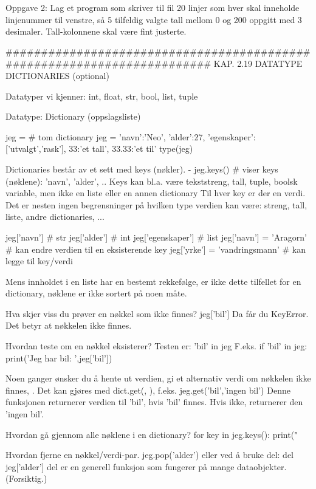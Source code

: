 {Oppgave 2: Lag et program som skriver til fil 20 linjer som hver skal inneholde linjenummer til venstre,
så 5 tilfeldig valgte tall mellom 0 og 200 oppgitt med 3 desimaler.
Tall-kolonnene skal være fint justerte. 

######################################################################## 
KAP. 2.19  DATATYPE DICTIONARIES  (optional)

Datatyper vi kjenner: int, float, str, bool, list, tuple 

Datatype: Dictionary (oppslagsliste)

jeg = {}  # tom dictionary
jeg = {'navn':'Neo', 'alder':27, 'egenskaper':['utvalgt','rask'], 33:'et tall', 33.33:'et til'} 
type(jeg) 

Dictionaries består av et sett med keys (nøkler). 
- jeg.keys()  # viser keys (nøklene): 'navn', 'alder', ..
Keys kan bl.a. være tekststreng, tall, tuple, boolsk variable, 
men ikke en liste eller en annen dictionary 
Til hver key er der en verdi. 
Det er nesten ingen begrensninger på hvilken type verdien kan være: 
streng, tall, liste, andre dictionaries, ...

jeg['navn']         # str
jeg['alder']        # int
jeg['egenskaper']   # list
jeg['navn'] = 'Aragorn'        # kan endre verdien til en eksisterende key
jeg['yrke'] = 'vandringsmann'  # kan legge til key/verdi 


Mens innholdet i en liste har en bestemt rekkefølge, er ikke dette tilfellet 
for en dictionary, nøklene er ikke sortert på noen måte.

Hva skjer viss du prøver en nøkkel som ikke finnes?
jeg['bil']
Da får du KeyError. Det betyr at nøkkelen ikke finnes.

Hvordan teste om en nøkkel eksisterer?
Testen er: 'bil' in jeg
F.eks.
if 'bil' in jeg:
   print('Jeg har bil: ',jeg['bil'])

Noen ganger ønsker du å hente ut verdien, gi et alternativ verdi om nøkkelen ikke finnes, 
.
Det kan gjøres med dict.get(, ), f.eks. 
jeg.get('bil','ingen bil')
Denne funksjonen returnerer verdien til 'bil', hvis 'bil' finnes. 
Hvis ikke, returnerer den 'ingen bil'.


Hvordan gå gjennom alle nøklene i en dictionary?
for key in jeg.keys():
   print("  %


Hvordan fjerne en nøkkel/verdi-par. 
jeg.pop('alder')
eller ved å bruke del: 
del jeg['alder']
del er en generell funksjon som fungerer på mange dataobjekter. (Forsiktig.) 


}
